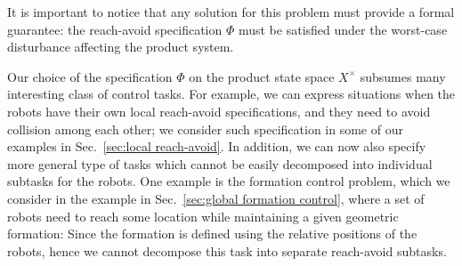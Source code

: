 It is important to notice that any solution for this problem must provide a formal guarantee: the reach-avoid specification $\Phi$ must be satisfied under the worst-case disturbance affecting the product system.

Our choice of the specification $\Phi$ on the product state space $X^\times$ subsumes many interesting class of control tasks.
For example, we can express situations when the robots have their own local reach-avoid specifications, and they need to avoid collision among each other; we consider such specification in some of our examples in Sec.~\ref{sec:local reach-avoid}.
In addition, we can now also specify more general type of tasks which cannot be easily decomposed into individual subtasks for the robots.
One example is the formation control problem, which we consider in the example in Sec.~\ref{sec:global formation control}, where a set of robots need to reach some location while maintaining a given geometric formation:
Since the formation is defined using the relative positions of the robots, hence we cannot decompose this task into separate reach-avoid subtasks.

